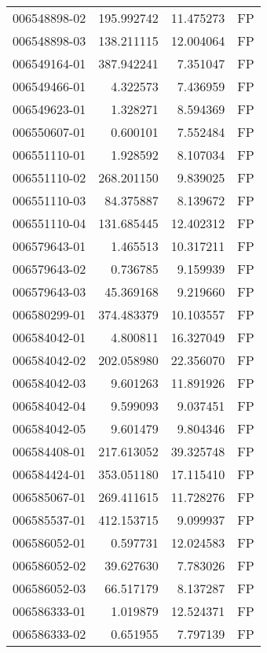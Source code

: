 \begin{tabular}{lrrl}
006548898-02 &  195.992742 &      11.475273 &   FP \\
006548898-03 &  138.211115 &      12.004064 &   FP \\
006549164-01 &  387.942241 &       7.351047 &   FP \\
006549466-01 &    4.322573 &       7.436959 &   FP \\
006549623-01 &    1.328271 &       8.594369 &   FP \\
006550607-01 &    0.600101 &       7.552484 &   FP \\
006551110-01 &    1.928592 &       8.107034 &   FP \\
006551110-02 &  268.201150 &       9.839025 &   FP \\
006551110-03 &   84.375887 &       8.139672 &   FP \\
006551110-04 &  131.685445 &      12.402312 &   FP \\
006579643-01 &    1.465513 &      10.317211 &   FP \\
006579643-02 &    0.736785 &       9.159939 &   FP \\
006579643-03 &   45.369168 &       9.219660 &   FP \\
006580299-01 &  374.483379 &      10.103557 &   FP \\
006584042-01 &    4.800811 &      16.327049 &   FP \\
006584042-02 &  202.058980 &      22.356070 &   FP \\
006584042-03 &    9.601263 &      11.891926 &   FP \\
006584042-04 &    9.599093 &       9.037451 &   FP \\
006584042-05 &    9.601479 &       9.804346 &   FP \\
006584408-01 &  217.613052 &      39.325748 &   FP \\
006584424-01 &  353.051180 &      17.115410 &   FP \\
006585067-01 &  269.411615 &      11.728276 &   FP \\
006585537-01 &  412.153715 &       9.099937 &   FP \\
006586052-01 &    0.597731 &      12.024583 &   FP \\
006586052-02 &   39.627630 &       7.783026 &   FP \\
006586052-03 &   66.517179 &       8.137287 &   FP \\
006586333-01 &    1.019879 &      12.524371 &   FP \\
006586333-02 &    0.651955 &       7.797139 &   FP \\

\end{tabular}
